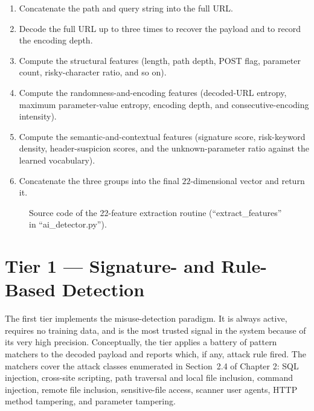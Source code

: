 \documentclass[12pt,a4paper]{report}
\begin{document}
\begin{enumerate}[leftmargin=1.8em, itemsep=2pt]
  \item Concatenate the path and query string into the full URL.
  \item Decode the full URL up to three times to recover the payload and to
        record the encoding depth.
  \item Compute the structural features (length, path depth, POST flag,
        parameter count, risky-character ratio, and so on).
  \item Compute the randomness-and-encoding features (decoded-URL entropy,
        maximum parameter-value entropy, encoding depth, and
        consecutive-encoding intensity).
  \item Compute the semantic-and-contextual features (signature score,
        risk-keyword density, header-suspicion scores, and the
        unknown-parameter ratio against the learned vocabulary).
  \item Concatenate the three groups into the final $22$-dimensional vector
        and return it.
\end{enumerate}

\begin{figure}[ht]
  \centering
  \caption{Source code of the 22-feature extraction routine
           (``extract\_features'' in ``ai\_detector.py'').}
  \label{fig:code-features}
\end{figure}

\section{Tier 1 --- Signature- and Rule-Based Detection}
\label{sec:tier1}

The first tier implements the misuse-detection paradigm. It is always
active, requires no training data, and is the most trusted signal in the
system because of its very high precision. Conceptually, the tier applies a
battery of pattern matchers to the decoded payload and reports which, if
any, attack rule fired. The matchers cover the attack classes enumerated in
Section~2.4 of Chapter 2: SQL injection, cross-site scripting, path
traversal and local file inclusion, command injection, remote file
inclusion, sensitive-file access, scanner user agents, HTTP method
tampering, and parameter tampering.
\end{document}
